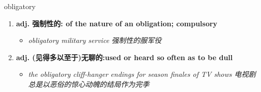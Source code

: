 
\begin{frame}
{\huge obligatory}
\begin{center}
\begin{enumerate}\Large
  \item \textbf{adj. 强制性的: of the nature of an obligation; compulsory}
  \begin{itemize}
    \item \em{\Large{obligatory military service 强制性的服军役}}
  \end{itemize}
  \item \textbf{adj. (见得多以至于)无聊的:used or heard so often as to be dull}
  \begin{itemize}
    \item \em{\Large{the obligatory cliff-hanger endings for season finales of TV shows 电视剧总是以恶俗的惊心动魄的结局作为完季}}
  \end{itemize}
\end{enumerate}
\end{center}
\end{frame}
